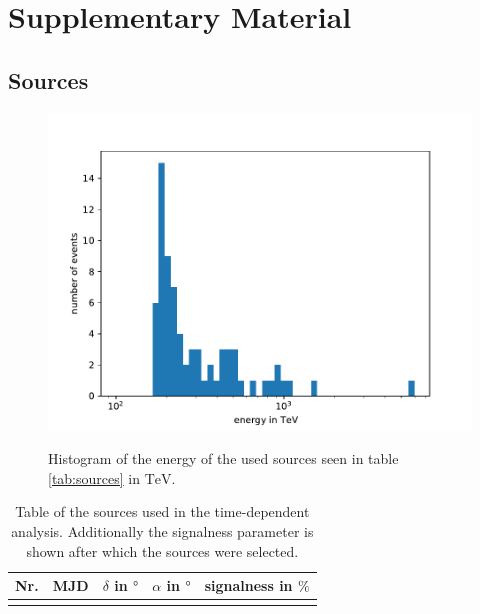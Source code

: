 \chapter{Supplementary Material}

\section{Sources}

\begin{figure}
    \centering
    \includegraphics[width=\linewidth]{Plots/appendix/sources_energy.pdf}
    \label{fig:sources_energy}
    \caption{Histogram of the energy of the used sources seen in table \ref{tab:sources} in $\si{\tera\electronvolt}$.}
\end{figure}

\begin{table}
  \centering
  \caption{Table of the sources used in the time-dependent analysis. Additionally the signalness parameter is shown after which the sources were selected.}
  \begin{tabular}{ccrrc}
    \toprule
    Nr. & MJD &  $\delta$ in $\si{\degree}$ & $\alpha$ in $\si{\degree}$ & signalness in $\si{\percent}$ \\
    \toprule
      
    \toprule
    \label{tab:sources_time_dep}
  \end{tabular}
\end{table}

